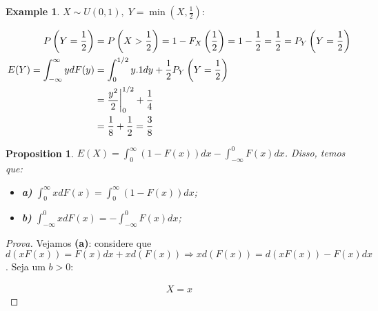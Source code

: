 \documentclass[
]{article}
\providecommand{\tightlist}{%
  \setlength{\itemsep}{0pt}\setlength{\parskip}{0pt}}
\newtheorem{proposition}{Proposition}[section]
\theoremstyle{definition}
\theoremstyle{definition}
\newtheorem{example}{Example}[section]
\theoremstyle{definition}
\theoremstyle{definition}
\theoremstyle{remark}
\begin{document}
\begin{example}
\(X \sim U(0,1),\; Y = \min\left(X,\frac{1}{2}\right)\):

\begin{align*}
P\left(Y = \frac{1}{2}\right) &= P\left(X > \frac{1}{2}\right) = 1 - F_{X}\left(\frac{1}{2}\right) = 1 - \frac{1}{2} = \frac{1}{2} = P_{Y}\left(Y = \frac{1}{2}\right)\\
E(Y) = \int_{-\infty}^{\infty}ydF(y) &= \int_{0}^{1/2}y.1dy + \frac{1}{2}P_{Y}\left(Y=\frac{1}{2}\right) \\
&= \frac{y^{2}}{2}\bigg{|}_{0}^{1/2} + \frac{1}{4} \\
&= \frac{1}{8} + \frac{1}{2} = \frac{3}{8}
\end{align*}
\end{example}

\begin{proposition}

\(E(X) = \int_{0}^{\infty}(1 - F(x))dx - \int_{-\infty}^{0}F(x)dx\). Disso, temos que:

\begin{itemize}
\tightlist
\item
  \textbf{a)} \(\int_{0}^{\infty}xdF(x) = \int_{0}^{\infty}(1 - F(x))dx\);
\item
  \textbf{b)} \(\int_{-\infty}^{0}xdF(x) = - \int_{-\infty}^{0}F(x)dx\);
\end{itemize}

\end{proposition}

\begin{proof}[Prova]
Vejamos \textbf{(a)}: considere que \(d(xF(x)) = F(x)dx + xd(F(x)) \Rightarrow xd(F(x)) = d(xF(x)) - F(x)dx\). Seja um \(b > 0\):

\begin{align*}
X=x
\end{align*}
\end{proof}
\end{document}
